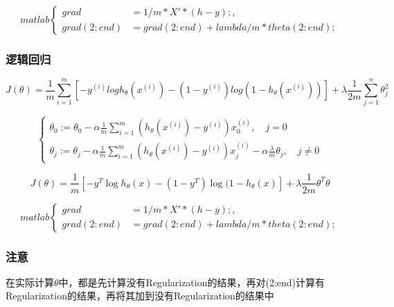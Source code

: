 \[matlab\begin{cases}
	grad &= 1/m * X'*(h-y); , \quad\\
	grad(2:end) &= grad(2:end) + lambda/m * theta(2:end);
\end{cases}\]



\subsubsection{逻辑回归}

\begin{equation}
	J(\theta) = \frac{1}{m}
	    \sum_{i=1}^m \left[ -y^{(i)}log{h_\theta(x^{(i)})} - (1-y^{(i)})log{(1-h_\theta(x^{(i)}))} \right]
		+ \lambda \frac{1}{2m} \sum_{j=1}^n\theta_j^2
\end{equation}

\[\begin{cases}
	\theta_0 := \theta_0 - \alpha \frac{1}{m} \sum_{i=1}^m(h_\theta(x^{(i)}) - y^{(i)})x_0^{(i)}, \quad j=0 \\
	\theta_j := \theta_j - \alpha \frac{1}{m} \sum_{i=1}^m(h_\theta(x^{(i)}) - y^{(i)})x_j^{(i)} - \alpha\frac{\lambda}{m}\theta_j, \quad j \neq 0
\end{cases}\]

\begin{equation}
		J(\theta) = \frac{1}{m} \left[-y^T \log{h_\theta(x)} - (1-y^T) \log{(1-h_\theta(x)}\right] + \lambda \frac{1}{2m}\theta^T \theta
\end{equation}


\[matlab\begin{cases}
	grad &= 1/m * X'*(h-y); , \quad\\
	grad(2:end) &= grad(2:end) + lambda/m * theta(2:end);
\end{cases}\]



\subsubsection{注意}
在实际计算$\theta$中，都是先计算没有Regularization的结果，再对(2:end)计算有Regularization的结果，再将其加到没有Regularization的结果中






